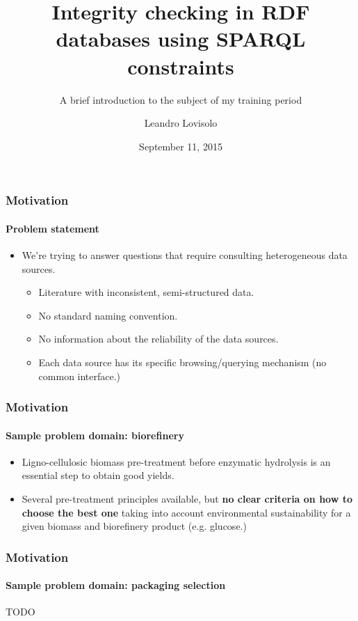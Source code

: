 \documentclass{beamer}
\title{Integrity checking in RDF databases using SPARQL constraints}
\subtitle{
  A brief introduction to the subject of my training period
}
\author{
  Leandro Lovisolo
}
\date{September 11, 2015}
\institute{
  I.N.R.A. SupAgro \\
  Montpellier, France
}
\begin{document}
\begin{frame}
  \titlepage
\end{frame}

\begin{frame}
  \frametitle{Motivation}
  \framesubtitle{Problem statement}

  \pause

  \begin{itemize}
    \item We're trying to answer questions that require consulting heterogeneous data sources.

    \pause

    \begin{itemize}
      \item Literature with inconsistent, semi-structured data.

      \pause

      \item No standard naming convention.

      \pause

      \item No information about the reliability of the data sources.

      \pause

      \item Each data source has its specific browsing/querying mechanism (no common interface.)
    \end{itemize}
  \end{itemize}
\end{frame}

\begin{frame}
  \frametitle{Motivation}
  \framesubtitle{Sample problem domain: \textbf{biorefinery}}

  \begin{itemize}
    \item Ligno-cellulosic biomass pre-treatment before enzymatic hydrolysis is an essential step to obtain good yields.

    \pause

    \item Several pre-treatment principles available, but \textbf{no clear criteria on how to choose the best one} taking into account environmental sustainability for a given biomass and biorefinery product (e.g. glucose.)
  \end{itemize}
\end{frame}

\begin{frame}
  \frametitle{Motivation}
  \framesubtitle{Sample problem domain: \textbf{packaging selection}}

  TODO
\end{frame}
\end{document}
